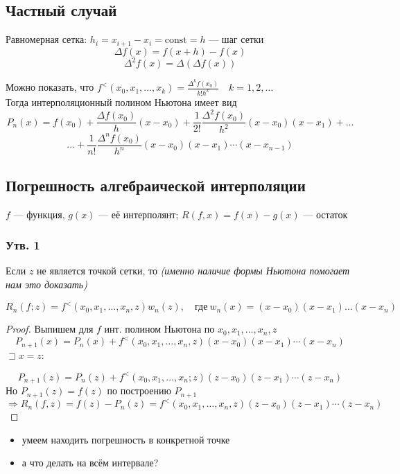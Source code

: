 \subsection*{Частный случай}

Равномерная сетка: $h_i = x_{i+1} - x_i = \text{const} = h$ --- шаг сетки
\[
\Delta f(x) = f(x + h) - f(x)
\]
\[
\Delta^2 f(x) = \Delta(\Delta f(x))
\]

Можно показать, что $f^{<}(x_0, x_1, \ldots, x_k) = \frac{\Delta^k f(x_0)}{k! h^k} \quad k=1,2,\ldots$ \\
Тогда интерполяционный полином Ньютона имеет вид
\[
P_n(x) = f(x_0) + \frac{\Delta f(x_0)}{h}(x - x_0) + \frac{1}{2!}\frac{\Delta^2 f(x_0)}{h^2}(x - x_0)(x - x_1) + \ldots
\]
\[
\ldots + \frac{1}{n!}\frac{\Delta^n f(x_0)}{h^n}(x - x_0)(x - x_1) \cdots (x - x_{n-1})
\]

\subsection*{Погрешность алгебраической интерполяции}

$f$ --- функция, $g(x)$ --- её интерполянт; $R(f, x) = f(x) - g(x)$ --- остаток

\subsubsection*{Утв. 1}
Если $z$ не является точкой сетки, то \textit{(именно наличие формы Ньютона помогает нам это доказать)}

\[
R_n(f; z) = f^{<}(x_0, x_1, \ldots, x_n, z) w_n(z), \quad \text{где} ~ w_n(x) = (x - x_0)(x - x_1) \ldots (x - x_n)
\]

\begin{proof}
Выпишем для $f$ инт. полином Ньютона по $x_0, x_1, \ldots, x_n, z$
\[
P_{n+1}(x) = P_n(x) + f^{<}(x_0, x_1, \ldots, x_n, z)(x - x_0)(x - x_1) \cdots (x - x_n)
\]
$\sqsupset x = z$:

\[
P_{n+1}(z) = P_n(z) + f^{<}(x_0, x_1, \ldots, x_n; z)(z - x_0)(z - x_1) \cdots (z - x_n)
\]
Но $P_{n+1}(z) = f(z)$ по построению $P_{n+1}$
\[
\Rightarrow R_n(f, z) = f(z) - P_n(z) = f^{<}(x_0, x_1, \ldots, x_n, z)(z - x_0)(z - x_1) \cdots (z - x_n)
\]
\end{proof}

\begin{itemize}
    \item умеем находить погрешность в конкретной точке
    \item а что делать на всём интервале?
\end{itemize}

